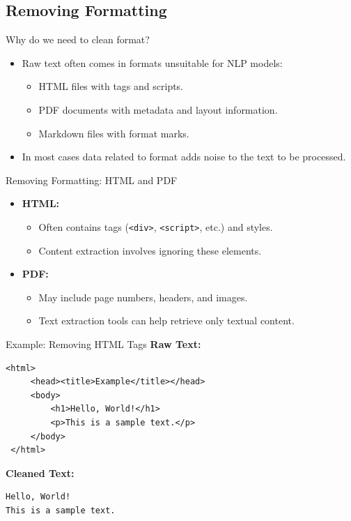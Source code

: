 \documentclass{beamer}
\begin{document}
\subsection{Removing Formatting}

\begin{frame}{Why do we need to clean format?}
    \begin{itemize}
        \item Raw text often comes in formats unsuitable for NLP models:
        \begin{itemize}
            \item HTML files with tags and scripts.
            \item PDF documents with metadata and layout information.
            \item Markdown files with format marks.
        \end{itemize}
        \item In most cases data related to format adds noise to the text to be processed.
    \end{itemize}
\end{frame}

\begin{frame}{Removing Formatting: HTML and PDF}
    \begin{itemize}
        \item \textbf{HTML:}
        \begin{itemize}
            \item Often contains tags (\texttt{<div>}, \texttt{<script>}, etc.) and styles.
            \item Content extraction involves ignoring these elements.
        \end{itemize}
        \item \textbf{PDF:}
        \begin{itemize}
            \item May include page numbers, headers, and images.
            \item Text extraction tools can help retrieve only textual content.
        \end{itemize}
    \end{itemize}
\end{frame}

\begin{frame}[fragile]{Example: Removing HTML Tags}
    \textbf{Raw Text:}
     \begin{lstlisting}[basicstyle=\ttfamily\small,backgroundcolor=\color{gray!10}]
 <html>
     <head><title>Example</title></head>
     <body>
         <h1>Hello, World!</h1>
         <p>This is a sample text.</p>
     </body>
 </html>
     \end{lstlisting}

     \vspace{1em}
     \textbf{Cleaned Text:}
    \begin{lstlisting}[basicstyle=\ttfamily\small,backgroundcolor=\color{gray!10}]
Hello, World!
This is a sample text.
    \end{lstlisting}
\end{frame}
\end{document}
